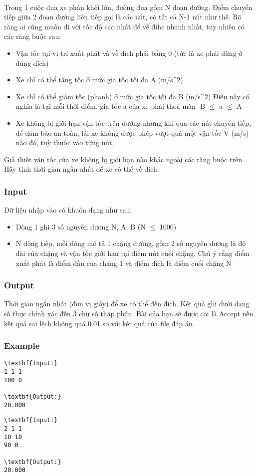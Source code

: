 

 

Trong 1 cuộc đua xe phân khối lớn, đường đua gồm N đoạn đường. Điểm chuyển tiếp giữa 2 đoạn đường liên tiếp gọi là các nút, có tất cả N-1 nút như thế. Rõ ràng ai cũng muốn đi với tốc độ cao nhất để về đíhc nhanh nhất, tuy nhiên có các ràng buộc sau:
\begin{itemize}
	\item Vận tốc tại vị trí xuất phát và về đích phải bằng 0 (tức là xe phải dừng ở đúng đích)
	\item Xe chỉ có thể tăng tốc ở mức gia tốc tối đa A (m/s^2)
	\item Xe chỉ có thể giảm tốc (phanh) ở mức gia tốc tối đa B (m/s^2) Điều này có nghĩa là tại mỗi thời điểm, gia tốc a của xe phải thoả mãn -B $\le$ a $\le$ A
	\item Xe không bị giới hạn vận tốc trên đường nhưng khi qua các nút chuyển tiếp, để đảm bảo an toàn, lái xe không được phép vượt quá một vận tốc V (m/s) nào đó, tuỳ thuộc vào từng nút.
\end{itemize}

Giả thiết vận tốc của xe không bị giới hạn nào khác ngoài các ràng buộc trên. Hãy tính thời gian ngắn nhất để xe có thể về đích.

\subsubsection{Input}

Dữ liệu nhập vào có khuôn dạng như sau:
\begin{itemize}
	\item Dòng 1 ghi 3 số nguyên dương N, A, B (N  $\le$  1000)
	\item N dòng tiếp, mỗi dòng mô tả 1 chặng đường, gồm 2 số nguyên dương là độ dài của chặng và vận tốc giới hạn tại điểm nút cuối chặng. Chú ý rằng điểm xuất phát là điểm đầu của chặng 1 và điểm đích là điểm cuối chặng N
\end{itemize}

\subsubsection{Output}

Thời gian ngắn nhất (đơn vị giây) để xe có thể đến đích. Kết quả ghi dưới dạng số thực chính xác đến 3 chữ số thập phân. Bài của bạn sẽ được coi là Accept nếu kết quả sai lệch không quá 0.01 so với kết quả của file đáp án.

\subsubsection{Example}
\begin{verbatim}
\textbf{Input:}
1 1 1
100 0

\textbf{Output:}
20.000
\end{verbatim}
\begin{verbatim}
\textbf{Input:}
2 1 1
10 10
90 0

\textbf{Output:}
20.000\end{verbatim}
